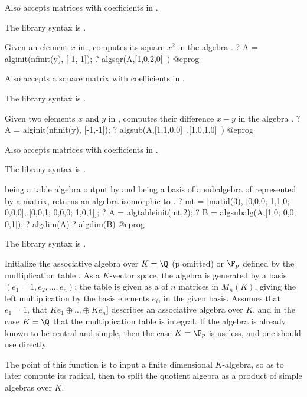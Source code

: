 Also accepts matrices with coefficients in .

The library syntax is .

\label{se:algsqr}
Given an element $x$ in , computes its square $x^2$ in the
algebra .
\bprog
? A = alginit(nfinit(y), [-1,-1]);
? algsqr(A,[1,0,2,0]~)
@eprog

Also accepts a square matrix with coefficients in .

The library syntax is .

\label{se:algsub}
Given two elements $x$ and $y$ in , computes their difference
$x-y$ in the algebra .
\bprog
? A = alginit(nfinit(y), [-1,-1]);
? algsub(A,[1,1,0,0]~,[1,0,1,0]~)
@eprog

Also accepts matrices with coefficients in .

The library syntax is .

\label{se:algsubalg}
 being a table algebra output by  and 
being a basis of a subalgebra of  represented by a matrix, returns an
algebra isomorphic to .
\bprog
? mt = [matid(3), [0,0,0; 1,1,0; 0,0,0], [0,0,1; 0,0,0; 1,0,1]];
? A = algtableinit(mt,2);
? B = algsubalg(A,[1,0; 0,0; 0,1]);
? algdim(A)
? algdim(B)
@eprog

The library syntax is .

\label{se:algtableinit}
Initialize the associative algebra over $K = \Q$ (p omitted) or $\F_p$
defined by the multiplication table .
As a $K$-vector space, the algebra is generated by a basis
$(e_1 = 1, e_2, \dots, e_n)$; the table is given as a  of $n$ matrices in
$M_n(K)$, giving the left multiplication by the basis elements $e_i$, in the
given basis.
Assumes that $e_1=1$, that $K e_1\oplus \dots\oplus K e_n]$ describes an
associative algebra over $K$, and in the case $K=\Q$ that the multiplication
table is integral. If the algebra is already known to be central
and simple, then the case $K = \F_p$ is useless, and one should use
 directly.

The point of this function is to input a finite dimensional $K$-algebra, so
as to later compute its radical, then to split the quotient algebra as a
product of simple algebras over $K$.

